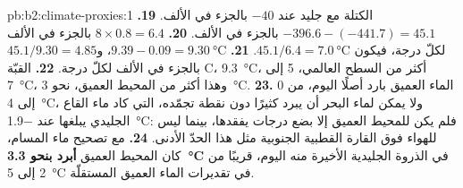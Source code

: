 \begin{solution}{pb:b2:climate-proxies:1}
الكتلة مع جليد عند $-40$ بالجزء في الألف.
\textbf{19.} $-396.6 - (-441.7) = 45.1$ بالجزء في الألف.
\textbf{20.} $8 \times 0.8 = 6.4$ بالجزء في الألف لكلّ درجة، فيكون $45.1/6.4 = \qty{7.0}{\celsius}$.
\textbf{21.} $9.39 - 0.09 = \qty{9.30}{\celsius}$، و$45.1/9.30 = 4.85$ بالجزء في الألف لكلّ درجة.
\textbf{22.} القبّة C، \qty{9.3}{\celsius}، أكثر من السطح العالمي، 5 إلى \qty{7}{\celsius}، وهذا أكثر
من المحيط العميق، نحو \qty{3}{\celsius}.
\textbf{23.} الماء العميق بارد أصلًا اليوم، من 0 إلى \qty{4}{\celsius}، ولا يمكن لماء البحر أن
يبرد كثيرًا دون نقطة تجمّده، التي كاد ماء القاع الجليدي يبلغها عند
\qty{-1.9}{\celsius}: فلم يكن للمحيط العميق إلا بضع درجات يفقدها، بينما ليس للهواء فوق القارة القطبية الجنوبية
مثل هذا الحدّ الأدنى.
\textbf{24.} مع تصحيح ماء المسام، كان المحيط العميق \textbf{أبرد بنحو \qty{3.3}{\celsius}}
في الذروة الجليدية الأخيرة منه اليوم، قريبًا من 2 إلى \qty{5}{\celsius} في
تقديرات الماء العميق المستقلّة.
\end{solution}

